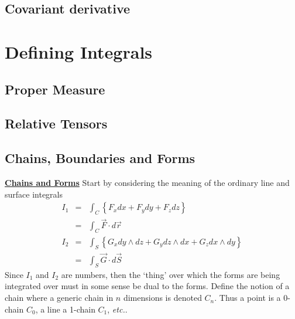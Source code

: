 \documentclass[twocolumn]{article}
\begin{document}
\subsection{Covariant derivative}\label{SS:cov_deriv}


\section{Defining Integrals}\label{S:def_int}

\subsection{Proper Measure}\label{SS:prop_meas}

\subsection{Relative Tensors}\label{SS:rel_ten}

\subsection{Chains, Boundaries and Forms}\label{SS:chns_bndrs}
\noindent{$\bullet$}\underline{\textbf{Chains and Forms}}
Start by considering the meaning of the ordinary line and surface 
integrals
\begin{eqnarray*}
  I_1 & = & \int_{C} \left\{F_x dx + F_y dy + F_z dz \right\} \\ 
      & = & \int_{C} {\vec F} \cdot d{\vec r} \\
  I_2 & = & \int_{S} \left\{G_x dy \wedge dz + G_y dz \wedge dx + 
                       G_z dx \wedge dy \right\} \\
	  & = & \int_{S} {\vec G} \cdot d{\vec S}													    
\end{eqnarray*}
Since $I_1$ and $I_2$ are numbers, then the `thing' over which the 
forms are being integrated over must in some sense be dual to the 
forms.  Define the notion of a chain where a generic chain in $n$ 
dimensions is denoted $C_n$.  Thus a point is a 0-chain $C_0$, a line 
a 1-chain $C_1$, \emph{etc.}.
\end{document}
